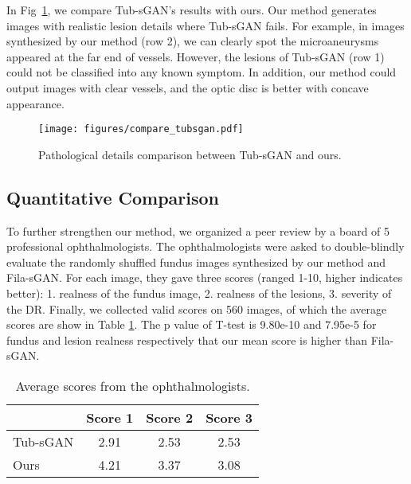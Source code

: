 \documentclass[letterpaper]{article} %
\begin{document}
    In Fig~\ref{fig:compare_tubsgan}, we compare Tub-sGAN's results with ours. Our method generates images with realistic lesion details where Tub-sGAN fails. For example, in images synthesized by our method (row 2), we can clearly spot the microaneurysms appeared at the far end of vessels. However, the lesions of Tub-sGAN (row 1) could not be classified into any known symptom. In addition, our method could output images with clear vessels, and the optic disc is better with concave appearance.
    
	\begin{figure}[t]
		\begin{center}
			\texttt{[image: figures/compare\_tubsgan.pdf]}
		\end{center}
		\caption{Pathological details comparison between Tub-sGAN and ours. }
		\label{fig:compare_tubsgan}
	\end{figure}
	
	\subsection{Quantitative Comparison}
	
	To further strengthen our method, we organized a peer review by a board of 5 professional ophthalmologists. The ophthalmologists were asked to double-blindly evaluate the randomly shuffled fundus images synthesized by our method and Fila-sGAN. For each image, they gave three scores (ranged 1-10, higher indicates better): 1. realness of the fundus image, 2. realness of the lesions, 3. severity of the DR. Finally, we collected valid scores on 560 images, of which the average scores are show in Table \ref{tab:quantitative_comparison}. The p value of T-test is 9.80e-10 and 7.95e-5 for fundus and lesion realness respectively that our mean score is higher than Fila-sGAN.
	
	\begin{table}[h!]
		\begin{center}
			\begin{tabularx}{0.8\columnwidth}{Xccc}
				\hline
				& Score 1 & Score 2 & Score 3 \\ \hline
				Tub-sGAN & 2.91 & 2.53 & 2.53 \\ 
				Ours & 4.21 & 3.37 & 3.08 \\ \hline
			\end{tabularx}
		\end{center}
		\caption{Average scores from the ophthalmologists.}
		\label{tab:quantitative_comparison}
	\end{table}
	
\end{document}

